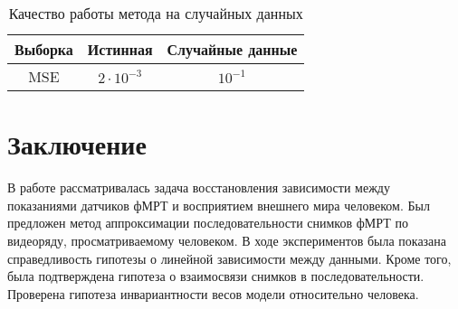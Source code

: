 \documentclass[a4paper, 12pt]{extarticle}
\begin{document}
\begin{table}[h!]
	\centering
	\caption{Качество работы метода на случайных данных}
	\begin{tabular}{|c|c|c|}
		\hline
		Выборка & Истинная          & Случайные данные \\ \hline \hline
		MSE     & $2 \cdot 10^{-3}$ & $10^{-1}$        \\ \hline
	\end{tabular}
	\label{table:random}
\end{table}

\newpage

\section{Заключение}

В работе рассматривалась задача восстановления зависимости между показаниями
датчиков фМРТ и восприятием внешнего мира человеком.
Был предложен метод аппроксимации последовательности снимков фМРТ по видеоряду,
просматриваемому человеком.
В ходе экспериментов была показана справедливость гипотезы о линейной зависимости между данными.
Кроме того, была подтверждена гипотеза о взаимосвязи снимков в последовательности.
Проверена гипотеза инвариантности весов модели относительно человека.

\newpage



\end{document}
